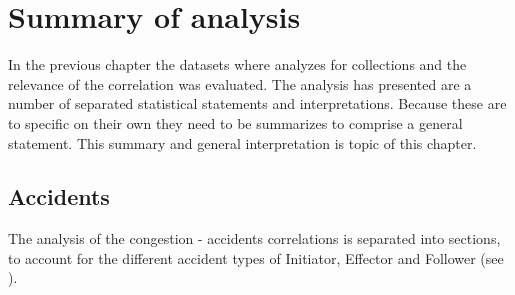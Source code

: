 \chapter{Summary of analysis}
\label{analysis_summary}
In the previous chapter the datasets where analyzes for collections and the relevance of the correlation was evaluated. The analysis has presented are a number of separated statistical statements and interpretations. Because these are to specific on their own they need to be summarizes to comprise a general statement. This summary and general interpretation is topic of this chapter.

\section{Accidents}
The analysis of the congestion -  accidents correlations is separated into sections, to account for the different accident types of Initiator, Effector and Follower (see \label{methodology_data_processing}). 

